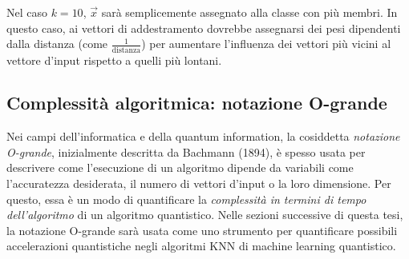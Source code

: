 
Nel caso $k=10$, $\vec{x}$ sarà semplicemente assegnato alla classe con più 
membri. In questo caso, ai vettori di addestramento dovrebbe assegnarsi dei pesi 
dipendenti dalla distanza (come $\frac{1}{\text{distanza}}$) per aumentare 
l'influenza dei vettori più vicini al vettore d'input rispetto a quelli più 
lontani. 

\subsection{Complessità algoritmica: notazione O-grande}

Nei campi dell'informatica e della quantum information, la cosiddetta 
\emph{notazione O-grande}, inizialmente descritta da Bachmann (1894), 
è spesso usata per descrivere come l'esecuzione di un algoritmo dipende 
da variabili come l'accuratezza desiderata, il numero di vettori d'input o la 
loro dimensione. Per questo, essa è un modo di quantificare la \emph{complessità 
in termini di tempo dell'algoritmo} di un algoritmo quantistico. Nelle sezioni 
successive di questa tesi, la notazione O-grande sarà usata come uno strumento 
per quantificare possibili accelerazioni quantistiche negli algoritmi \ac{KNN} di 
machine learning quantistico. 


